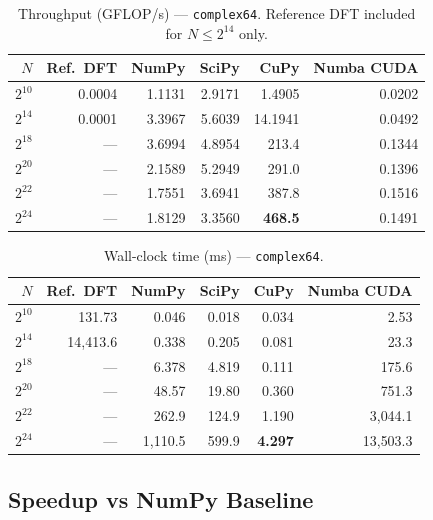\documentclass[12pt, letterpaper]{article}
\begin{document}
\begin{table}[H]
\centering
\caption{Throughput (GFLOP/s) --- \texttt{complex64}. Reference DFT included for $N \leq 2^{14}$ only.}
\begin{tabular}{@{}rrrrrr@{}}
\toprule
$N$ & \textbf{Ref.\ DFT} & \textbf{NumPy} & \textbf{SciPy} & \textbf{CuPy} & \textbf{Numba CUDA} \\
\midrule
$2^{10}$  & 0.0004 & 1.1131 & 2.9171 & 1.4905  & 0.0202 \\
$2^{14}$  & 0.0001 & 3.3967 & 5.6039 & 14.1941 & 0.0492 \\
$2^{18}$  & ---    & 3.6994 & 4.8954 & 213.4   & 0.1344 \\
$2^{20}$  & ---    & 2.1589 & 5.2949 & 291.0   & 0.1396 \\
$2^{22}$  & ---    & 1.7551 & 3.6941 & 387.8   & 0.1516 \\
$2^{24}$  & ---    & 1.8129 & 3.3560 & \textbf{468.5}   & 0.1491 \\
\bottomrule
\end{tabular}
\label{tab:gflops_c64}
\end{table}

\begin{table}[H]
\centering
\caption{Wall-clock time (ms) --- \texttt{complex64}.}
\begin{tabular}{@{}rrrrrr@{}}
\toprule
$N$ & \textbf{Ref.\ DFT} & \textbf{NumPy} & \textbf{SciPy} & \textbf{CuPy} & \textbf{Numba CUDA} \\
\midrule
$2^{10}$  & 131.73 & 0.046  & 0.018 & 0.034  & 2.53    \\
$2^{14}$  & 14{,}413.6 & 0.338  & 0.205 & 0.081  & 23.3    \\
$2^{18}$  & ---    & 6.378  & 4.819 & 0.111  & 175.6   \\
$2^{20}$  & ---    & 48.57  & 19.80 & 0.360  & 751.3   \\
$2^{22}$  & ---    & 262.9  & 124.9 & 1.190  & 3{,}044.1 \\
$2^{24}$  & ---    & 1{,}110.5 & 599.9 & \textbf{4.297} & 13{,}503.3 \\
\bottomrule
\end{tabular}
\label{tab:wallclock_c64}
\end{table}

\subsection{Speedup vs NumPy Baseline}
\end{document}
